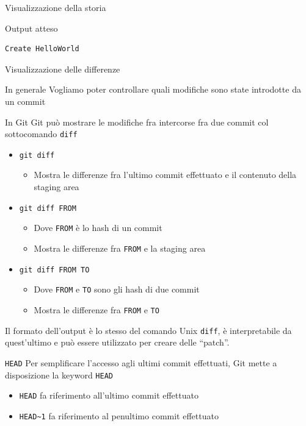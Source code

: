 \documentclass[presentation]{beamer}
\begin{document}
\begin{frame}{Visualizzazione della storia}
\begin{block}{Output atteso}
\begin{Verbatim}[fontsize=\tiny]
      Create HelloWorld
		\end{Verbatim}
	\end{block}
\end{frame}

\begin{frame}{Visualizzazione delle differenze}
	\begin{block}{In generale}
		Vogliamo poter controllare quali modifiche sono state introdotte da un commit
	\end{block}
	\begin{block}{In Git}
		Git può mostrare le modifiche fra intercorse fra due commit col sottocomando \texttt{diff}
		\begin{itemize}
			\item \texttt{git diff}
			\begin{itemize}
				\item Mostra le differenze fra l'ultimo commit effettuato e il contenuto della staging area
			\end{itemize}
			\item \texttt{git diff FROM}
			\begin{itemize}
				\item Dove \texttt{FROM} è lo hash di un commit
				\item Mostra le differenze fra \texttt{FROM} e la staging area
			\end{itemize}
			\item \texttt{git diff FROM TO}
			\begin{itemize}
				\item Dove \texttt{FROM} e \texttt{TO} sono gli hash di due commit
				\item Mostra le differenze fra \texttt{FROM} e \texttt{TO}
			\end{itemize}
		\end{itemize}
		Il formato dell'output è lo stesso del comando Unix \texttt{diff}, è interpretabile da quest'ultimo e può essere utilizzato per creare delle ``patch''.
	\end{block}
	\begin{block}{\texttt{HEAD}}
		Per semplificare l'accesso agli ultimi commit effettuati, Git mette a disposizione la keyword \texttt{HEAD}
		\begin{itemize}
			\item \texttt{HEAD} fa riferimento all'ultimo commit effettuato
			\item \texttt{HEAD\textasciitilde{}1} fa riferimento al penultimo commit effettuato

\end{itemize}
\end{block}
\end{frame}
\end{document}
